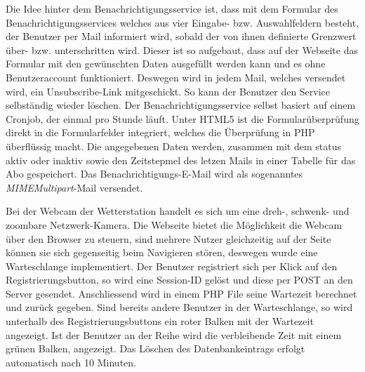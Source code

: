 \documentclass[10pt]{article}
\begin{document}
\begin{multicols}{2}
Die Idee hinter dem Benachrichtigungsservice ist, dass mit dem  Formular des Benachrichtigungsservices welches aus vier Eingabe- bzw. Auswahlfeldern besteht, der Benutzer per Mail informiert wird, sobald der von ihnen definierte Grenzwert über- bzw. unterschritten wird.  Dieser ist so aufgebaut, dass auf der Webseite das Formular mit den gewünschten Daten ausgefüllt werden kann und es ohne Benutzeraccount funktioniert. Deswegen wird in jedem Mail, welches versendet wird, ein Unsubscribe-Link mitgeschickt. So kann der Benutzer den Service selbständig wieder löschen. Der Benachrichtigungsservice selbst basiert auf einem Cronjob, der einmal pro Stunde läuft. Unter HTML5 ist die Formularüberprüfung direkt in die Formularfelder integriert, welches die Überprüfung in PHP überflüssig macht. Die angegebenen Daten werden, zusammen mit dem status aktiv oder inaktiv sowie den Zeitstepmel des letzen Mails in einer Tabelle für das Abo gespeichert. Das Benachrichtigungs-E-Mail wird als sogenanntes \emph{MIMEMultipart}-Mail versendet.

Bei der Webcam der Wetterstation handelt es sich um eine dreh-, schwenk- und zoombare Netzwerk-Kamera. Die Webseite bietet die Möglichkeit die Webcam über den Browser zu steuern, sind mehrere Nutzer gleichzeitig auf der Seite können sie sich gegenseitig beim Navigieren stören, deswegen wurde eine Warteschlange implementiert. Der Benutzer registriert sich per Klick auf den Registrierungsbutton, so wird eine Session-ID gelöst und diese per POST an den Server gesendet. Anschliessend wird in einem PHP File seine Wartezeit berechnet und zurück gegeben. Sind bereits andere Benutzer in der Warteschlange, so wird unterhalb des Registrierungsbuttons ein roter Balken mit der Wartezeit angezeigt. Ist der Benutzer an der Reihe wird die verbleibende Zeit mit einem grünen Balken, angezeigt. Das Löschen des Datenbankeintrags erfolgt automatisch nach 10 Minuten.
\end{multicols}
 
\end{document}
